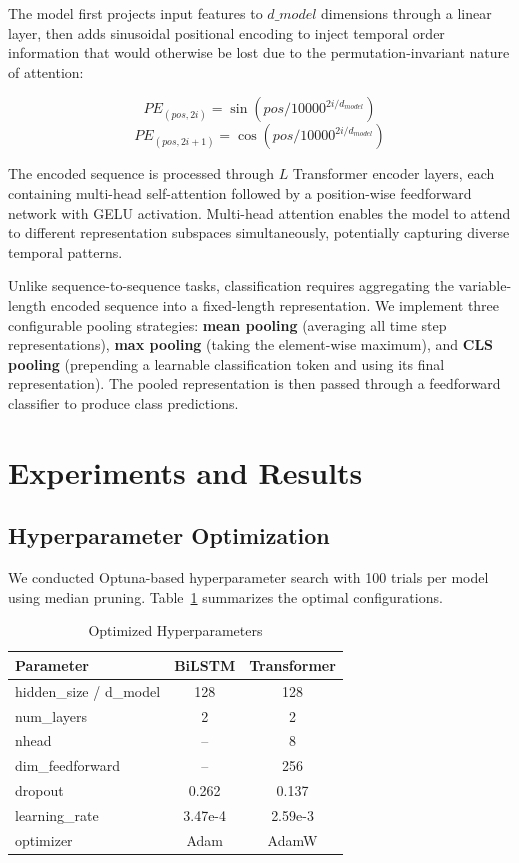 \documentclass[conference]{IEEEtran}
\begin{document}
The model first projects input features to $d\_model$ dimensions through a linear layer, then adds sinusoidal positional encoding to inject temporal order information that would otherwise be lost due to the permutation-invariant nature of attention:

\begin{equation}
PE_{(pos, 2i)} = \sin(pos / 10000^{2i / d_{model}})
\end{equation}
\begin{equation}
PE_{(pos, 2i+1)} = \cos(pos / 10000^{2i / d_{model}})
\end{equation}

The encoded sequence is processed through $L$ Transformer encoder layers, each containing multi-head self-attention followed by a position-wise feedforward network with GELU activation. Multi-head attention enables the model to attend to different representation subspaces simultaneously, potentially capturing diverse temporal patterns.

Unlike sequence-to-sequence tasks, classification requires aggregating the variable-length encoded sequence into a fixed-length representation. We implement three configurable pooling strategies: \textbf{mean pooling} (averaging all time step representations), \textbf{max pooling} (taking the element-wise maximum), and \textbf{CLS pooling} (prepending a learnable classification token and using its final representation). The pooled representation is then passed through a feedforward classifier to produce class predictions.

\section{Experiments and Results}

\subsection{Hyperparameter Optimization}
We conducted Optuna-based hyperparameter search with 100 trials per model using median pruning. Table~\ref{tab:optuna} summarizes the optimal configurations.

\begin{table}[htbp]
\caption{Optimized Hyperparameters}
\label{tab:optuna}
\centering
\begin{tabular}{lcc}
\toprule
\textbf{Parameter} & \textbf{BiLSTM} & \textbf{Transformer} \\
\midrule
hidden\_size / d\_model & 128 & 128 \\
num\_layers & 2 & 2 \\
nhead & -- & 8 \\
dim\_feedforward & -- & 256 \\
dropout & 0.262 & 0.137 \\
learning\_rate & 3.47e-4 & 2.59e-3 \\
optimizer & Adam & AdamW \\
\bottomrule
\end{tabular}
\end{table}
\end{document}

